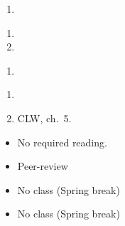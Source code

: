 \documentclass{article}
\begin{document}
\dia{}
\begin{enumerate}
\item {}
\end{enumerate}

\dia{}
\begin{enumerate}
\item {}
\item {}
\end{enumerate}


\dia{}
\begin{enumerate}
\item {}
\end{enumerate}

\dia{}
\begin{enumerate}
\item {}
\item CLW, ch.~5.
\end{enumerate}

\dia{}
\begin{itemize}
\item[ ] No required reading.
\end{itemize}

\dia{}
\begin{itemize}
\item[ ] Peer-review
\end{itemize}


\week{}
\dia{}
\begin{itemize}
\item[ ] No class (Spring break)
\end{itemize}

\dia{}
\begin{itemize}
\item[ ] No class (Spring break)
\end{itemize}
\end{document}
